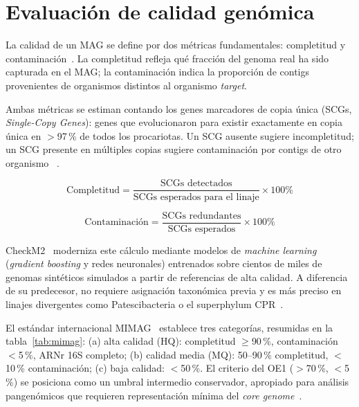 \section{Evaluación de calidad genómica}
\label{sec:quality}

La calidad de un MAG se define por dos métricas fundamentales:
completitud y contaminación~\cite{bowers2017}. La
completitud refleja qué fracción del genoma real ha sido capturada en
el MAG; la contaminación indica la proporción de contigs provenientes
de organismos distintos al organismo \textit{target}.

Ambas métricas se estiman contando los genes marcadores de
copia única (SCGs, \textit{Single-Copy Genes}): genes que evolucionaron
para existir exactamente en copia única en $>$97\,\% de todos los
procariotas. Un SCG ausente sugiere incompletitud; un SCG presente en
múltiples copias sugiere contaminación por contigs de otro organismo ~\cite{bowers2017,Parks2015}.

\begin{equation}
    \text{Completitud} =
    \frac{\text{SCGs detectados}}{\text{SCGs esperados para el linaje}}
    \times 100\%
    \label{eq:completeness}
\end{equation}

\begin{equation}
    \text{Contaminación} =
    \frac{\text{SCGs redundantes}}{\text{SCGs esperados}}
    \times 100\%
    \label{eq:contamination}
\end{equation}

CheckM2~\cite{checkm2} moderniza este cálculo mediante modelos de
\textit{machine learning} (\textit{gradient boosting} y redes
neuronales) entrenados sobre cientos de miles de genomas sintéticos simulados a partir de referencias de alta calidad. A diferencia de su predecesor, no requiere asignación
taxonómica previa y es más preciso en linajes divergentes como
Patescibacteria o el superphylum CPR~\cite{checkm2}.

El estándar internacional MIMAG~\cite{bowers2017} establece tres
categorías, resumidas en la tabla~\ref{tab:mimag}: (a) alta calidad
(HQ): completitud $\geq$90\,\%, contaminación $<$5\,\%, ARNr 16S
completo; (b) calidad media (MQ): 50--90\,\% completitud, $<$10\,\%
contaminación; (c) baja calidad: $<$50\,\%. El criterio del OE1
($>$70\,\%, $<$5\,\%) se posiciona como un umbral intermedio
conservador, apropiado para análisis pangenómicos que requieren
representación mínima del \textit{core genome}~\cite{bowers2017,
checkm2}.


